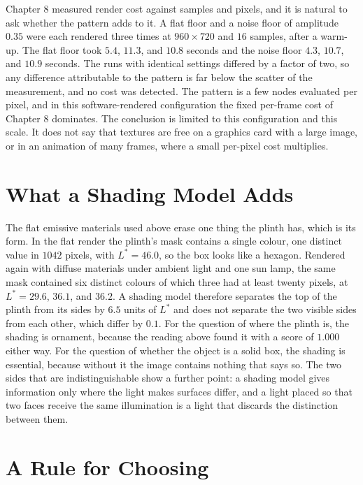 Chapter 8 measured render cost against samples and pixels, and it is natural to ask whether the pattern adds to it. A flat floor and a noise floor of amplitude $0.35$ were each rendered three times at $960\times720$ and $16$ samples, after a warm-up. The flat floor took $5.4$, $11.3$, and $10.8$ seconds and the noise floor $4.3$, $10.7$, and $10.9$ seconds. The runs with identical settings differed by a factor of two, so any difference attributable to the pattern is far below the scatter of the measurement, and no cost was detected. The pattern is a few nodes evaluated per pixel, and in this software-rendered configuration the fixed per-frame cost of Chapter 8 dominates. The conclusion is limited to this configuration and this scale. It does not say that textures are free on a graphics card with a large image, or in an animation of many frames, where a small per-pixel cost multiplies.

\section{What a Shading Model Adds}

The flat emissive materials used above erase one thing the plinth has, which is its form. In the flat render the plinth's mask contains a single colour, one distinct value in $1042$ pixels, with $L^*=46.0$, so the box looks like a hexagon. Rendered again with diffuse materials under ambient light and one sun lamp, the same mask contained six distinct colours of which three had at least twenty pixels, at $L^*=29.6$, $36.1$, and $36.2$. A shading model therefore separates the top of the plinth from its sides by $6.5$ units of $L^*$ and does not separate the two visible sides from each other, which differ by $0.1$. For the question of where the plinth is, the shading is ornament, because the reading above found it with a score of $1.000$ either way. For the question of whether the object is a solid box, the shading is essential, because without it the image contains nothing that says so. The two sides that are indistinguishable show a further point: a shading model gives information only where the light makes surfaces differ, and a light placed so that two faces receive the same illumination is a light that discards the distinction between them.

\section{A Rule for Choosing}


